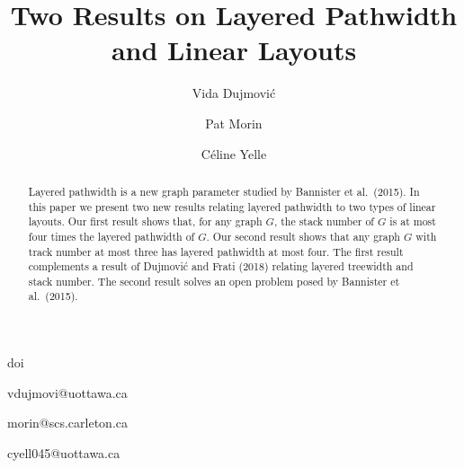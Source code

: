 \documentclass{jgaa-art}
\date{}
\newcommand{\etal}{et al.}
\begin{document}
\doi{}

doi{}
\title{Two Results on Layered Pathwidth and Linear Layouts}

\author[first]{Vida Dujmović}{vdujmovi@uottawa.ca}
\author[second]{Pat Morin}{morin@scs.carleton.ca}
\author[first]{Céline Yelle}{cyell045@uottawa.ca}





%
%
%
%
%
%
%
%
%
%

\maketitle


\begin{abstract}
  Layered pathwidth is a new graph parameter studied by Bannister \etal\ (2015). In this paper we present two new results relating layered pathwidth to two types of linear layouts.  Our first result shows that, for any graph $G$, the stack number of $G$ is at most four times the layered pathwidth of $G$.   Our second result shows that any graph $G$ with track number at most three has layered pathwidth at most four.  The first result complements a result of Dujmović and Frati (2018) relating layered treewidth and stack number.  The second result solves an open problem posed by Bannister \etal\ (2015).
\end{abstract}
\end{document}
